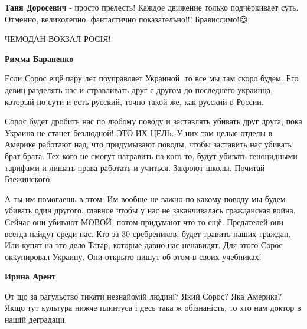 \begin{itemize}
\begin{itemize}

\textbf{Таня Доросевич} - просто прелесть! Каждое движение только подчёркивает суть. Отменно, великолепно, фантастично показательно!!! Брависсимо!😍
\end{itemize}


ЧЕМОДАН-ВОКЗАЛ-РОСІЯ!

\begin{itemize}


\textbf{Римма Бараненко} 

Если Сорос ещё пару лет поуправляет Украиной, то все мы там скоро будем. Его
девиц разделять нас и стравливать друг с другом до последнего украинца, который
по сути и есть русский, точно такой же, как русский в России. 

Сорос будет дробить нас по любому поводу и заставлять убивать друг друга, пока
Украина не станет безлюдной! ЭТО ИХ ЦЕЛЬ. У них там целые отделы в Америке
работают над, что придумывают поводы, чтобы заставить нас убивать брат брата.
Тех кого не смогут натравить на кого-то, будут убивать геноцидными тарифами и
лишать права работать и учиться. Закроют школы. Почитай Бзежинского. 

А ты им помогаешь в этом. Им вообще не важно по какому поводу мы будем убивать
один другого, главное чтобы у нас не заканчивалась гражданская война. Сейчас
они убивают МОВОЙ, потом придумают что-то ещё. Предателей они всегда найдут
среди нас. Кто за 30 сребреников, будет травить наших граждан. Или купят на это
дело Татар, которые давно нас ненавидят. Для этого Сорос оккупировал Украину.
Они открыто пишут об этом в своих учебниках!


\textbf{Ирина Арент} 

От що за рагульство тикати незнайомій людині? Який Сорос? Яка Америка? Якщо тут
культура нижче плинтуса і десь така ж обізнаність, то хто нам доктор в нашій
деградації.


\end{itemize}
\end{itemize}

